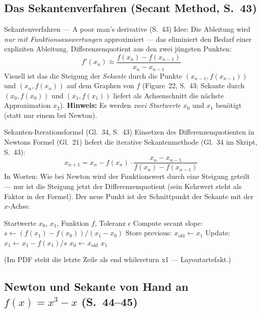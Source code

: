 \subsection{Das Sekantenverfahren (Secant Method, S.~43)}

\begin{defbox}{Sekantenverfahren — \glqq A poor man's derivative\grqq{} (S.~43)}
Idee: Die Ableitung wird \emph{nur mit Funktionsauswertungen} approximiert — das eliminiert den Bedarf einer expliziten Ableitung. Differenzenquotient aus den zwei jüngsten Punkten:
\[ f'(x_n) \approx \frac{f(x_n) - f(x_{n-1})}{x_n - x_{n-1}} \]
Visuell ist das die Steigung der \emph{Sekante} durch die Punkte $(x_{n-1}, f(x_{n-1}))$ und $(x_n, f(x_n))$ auf dem Graphen von $f$ (Figure~22, S.~43: Sekante durch $(x_0, f(x_0))$ und $(x_1, f(x_1))$ liefert als Achsenschnitt die nächste Approximation $x_2$). \textbf{Hinweis:} Es werden \emph{zwei Startwerte} $x_0$ und $x_1$ benötigt (statt nur einem bei Newton).
\end{defbox}

\begin{satzbox}{Sekanten-Iterationsformel (Gl.~34, S.~43)}
Einsetzen des Differenzenquotienten in Newtons Formel (Gl.~21) liefert die iterative Sekantenmethode (Gl.~34 im Skript, S.~43):
\[ x_{n+1} = x_n - f(x_n) \cdot \frac{x_n - x_{n-1}}{f(x_n) - f(x_{n-1})} \tag{Gl.~34} \]
In Worten: Wie bei Newton wird der Funktionswert durch eine Steigung geteilt — nur ist die Steigung jetzt der Differenzenquotient (sein Kehrwert steht als Faktor in der Formel). Der neue Punkt ist der Schnittpunkt der Sekante mit der $x$-Achse.
\end{satzbox}

\begin{algorithm}[H]
\caption{Secant Method (Algorithmus 2 im Skript, S.~43)}
\begin{algorithmic}[1]
\Require Startwerte $x_0$, $x_1$, Funktion $f$, Toleranz $\epsilon$
  \State Compute secant slope: $s \gets \left(f(x_1) - f(x_0)\right) / \left(x_1 - x_0\right)$
  \State Store previous: $x_{\text{old}} \gets x_1$
  \State Update: $x_1 \gets x_1 - f(x_1)/s$
  \State $x_0 \gets x_{\text{old}}$
\EndWhile
\State \Return $x_1$
\end{algorithmic}
\end{algorithm}

\noindent (Im PDF steht die letzte Zeile als \glqq end whilereturn x1\grqq{} — Layoutartefakt.)

\subsection{Newton und Sekante von Hand an $f(x) = x^3 - x$ (S.~44--45)}

